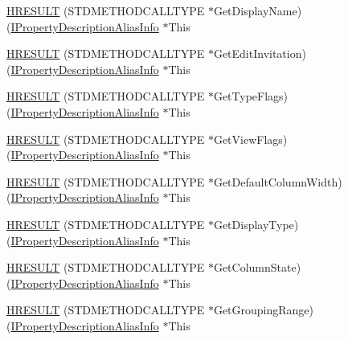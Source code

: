 \begin{DoxyCompactItemize}
\item 
\hyperlink{struct_i_property_description_alias_info_vtbl_a89d7f1a180677cb47842ecf849fc88b5}{H\+R\+E\+S\+U\+LT} (S\+T\+D\+M\+E\+T\+H\+O\+D\+C\+A\+L\+L\+T\+Y\+PE $\ast$Get\+Display\+Name)(\hyperlink{propsys_8h_a340fea8f1bc0adf5146e75d71bbdf9bc}{I\+Property\+Description\+Alias\+Info} $\ast$This
\item 
\hyperlink{struct_i_property_description_alias_info_vtbl_ac7211895800d21986b03920aad43dc06}{H\+R\+E\+S\+U\+LT} (S\+T\+D\+M\+E\+T\+H\+O\+D\+C\+A\+L\+L\+T\+Y\+PE $\ast$Get\+Edit\+Invitation)(\hyperlink{propsys_8h_a340fea8f1bc0adf5146e75d71bbdf9bc}{I\+Property\+Description\+Alias\+Info} $\ast$This
\item 
\hyperlink{struct_i_property_description_alias_info_vtbl_ac9a292a1a958913dac3a13591b5107d1}{H\+R\+E\+S\+U\+LT} (S\+T\+D\+M\+E\+T\+H\+O\+D\+C\+A\+L\+L\+T\+Y\+PE $\ast$Get\+Type\+Flags)(\hyperlink{propsys_8h_a340fea8f1bc0adf5146e75d71bbdf9bc}{I\+Property\+Description\+Alias\+Info} $\ast$This
\item 
\hyperlink{struct_i_property_description_alias_info_vtbl_ae49d454e18f75b682b7746c460d063db}{H\+R\+E\+S\+U\+LT} (S\+T\+D\+M\+E\+T\+H\+O\+D\+C\+A\+L\+L\+T\+Y\+PE $\ast$Get\+View\+Flags)(\hyperlink{propsys_8h_a340fea8f1bc0adf5146e75d71bbdf9bc}{I\+Property\+Description\+Alias\+Info} $\ast$This
\item 
\hyperlink{struct_i_property_description_alias_info_vtbl_aa17d5a954f2b78e33f129079b5ea8059}{H\+R\+E\+S\+U\+LT} (S\+T\+D\+M\+E\+T\+H\+O\+D\+C\+A\+L\+L\+T\+Y\+PE $\ast$Get\+Default\+Column\+Width)(\hyperlink{propsys_8h_a340fea8f1bc0adf5146e75d71bbdf9bc}{I\+Property\+Description\+Alias\+Info} $\ast$This
\item 
\hyperlink{struct_i_property_description_alias_info_vtbl_a1cdc1231084cb995bdf5f8dd26b3b604}{H\+R\+E\+S\+U\+LT} (S\+T\+D\+M\+E\+T\+H\+O\+D\+C\+A\+L\+L\+T\+Y\+PE $\ast$Get\+Display\+Type)(\hyperlink{propsys_8h_a340fea8f1bc0adf5146e75d71bbdf9bc}{I\+Property\+Description\+Alias\+Info} $\ast$This
\item 
\hyperlink{struct_i_property_description_alias_info_vtbl_a8e0432db7e8dd0e6646a80dec1477c90}{H\+R\+E\+S\+U\+LT} (S\+T\+D\+M\+E\+T\+H\+O\+D\+C\+A\+L\+L\+T\+Y\+PE $\ast$Get\+Column\+State)(\hyperlink{propsys_8h_a340fea8f1bc0adf5146e75d71bbdf9bc}{I\+Property\+Description\+Alias\+Info} $\ast$This
\item 
\hyperlink{struct_i_property_description_alias_info_vtbl_a4b106fe403d0f40baa02873a1ddf59da}{H\+R\+E\+S\+U\+LT} (S\+T\+D\+M\+E\+T\+H\+O\+D\+C\+A\+L\+L\+T\+Y\+PE $\ast$Get\+Grouping\+Range)(\hyperlink{propsys_8h_a340fea8f1bc0adf5146e75d71bbdf9bc}{I\+Property\+Description\+Alias\+Info} $\ast$This

\end{DoxyCompactItemize}
